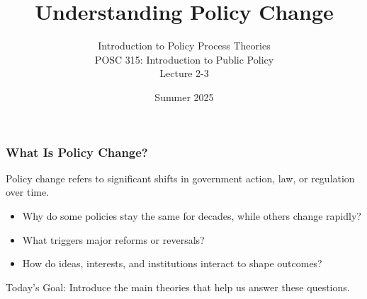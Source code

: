 \documentclass[10pt]{beamer}
\begin{document}
\title{Understanding Policy Change}
\subtitle{Introduction to Policy Process Theories\\POSC 315: Introduction to Public Policy\\Lecture 2-3}
\date{Summer 2025}

\maketitle

\begin{frame}
\frametitle{What Is Policy Change?}

\begin{block}{}
  \centering
  Policy change refers to significant shifts in government action, law, or regulation over time.
\end{block}

\vspace{0.5cm}

\begin{itemize}
  \item Why do some policies stay the same for decades, while others change rapidly?
  \item What triggers major reforms or reversals?
  \item How do ideas, interests, and institutions interact to shape outcomes?
\end{itemize}

\pause
\vspace{0.5cm}

\begin{alertblock}{Today's Goal:}
  Introduce the main theories that help us answer these questions.
\end{alertblock}

\end{frame}
\end{document}
